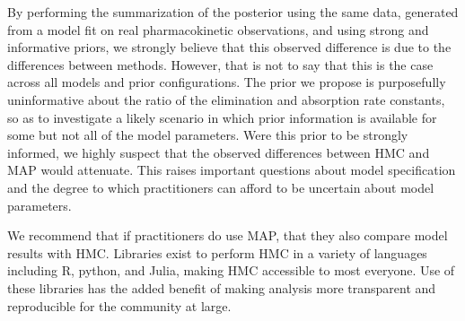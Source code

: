 By performing the summarization of the posterior using the same data, generated from a model fit on real pharmacokinetic observations, and using strong and informative priors, we strongly believe that this observed difference is due to the differences between methods. However, that is not to say that this is the case across all models and prior configurations.  The prior we propose is purposefully uninformative about the ratio of the elimination and absorption rate constants, so as to investigate a likely scenario in which prior information is available for some but not all of the model parameters.  Were this prior to be strongly informed, we highly suspect that the observed differences between HMC and MAP would attenuate.  This raises important questions about model specification and the degree to which practitioners can afford to be uncertain about model parameters.

We recommend that if practitioners do use MAP, that they also compare model results with HMC.  Libraries exist to perform HMC in a variety of languages including R, python, and Julia, making HMC accessible to most everyone.  Use of these libraries has the added benefit of making analysis more transparent and reproducible for the community at large.


